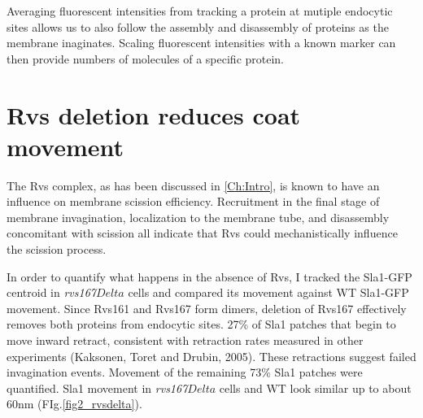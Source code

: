 Averaging fluorescent intensities from tracking a protein at mutiple endocytic sites allows us to also follow the assembly and disassembly of proteins as the membrane inaginates. Scaling fluorescent intensities with a known marker can then provide numbers of molecules of a specific protein.


\newpage
\section{Rvs deletion reduces coat movement}
\label{sec:rvsdel}
The Rvs complex, as has been discussed in \ref{Ch:Intro}, is known to have an influence on membrane scission efficiency. Recruitment in the final stage of membrane invagination, localization to the membrane tube, and disassembly concomitant with scission all indicate that Rvs could mechanistically influence the scission process.

	\vspace{5mm}
In order to quantify what happens in the absence of Rvs, I tracked the Sla1-GFP centroid in \textit{rvs167$Delta$} cells and compared its movement against WT Sla1-GFP movement. Since Rvs161 and Rvs167 form dimers, deletion of Rvs167 effectively removes both proteins from endocytic sites. 27\% of Sla1 patches that begin to move inward retract, consistent with retraction rates measured in other experiments (Kaksonen, Toret and Drubin, 2005). These retractions suggest failed invagination events. Movement of the remaining 73\% Sla1 patches were quantified. Sla1 movement in \textit{rvs167$Delta$} cells and WT look similar up to about 60nm (FIg.\ref{fig2_rvsdelta}). 

\vspace{2mm}
	
